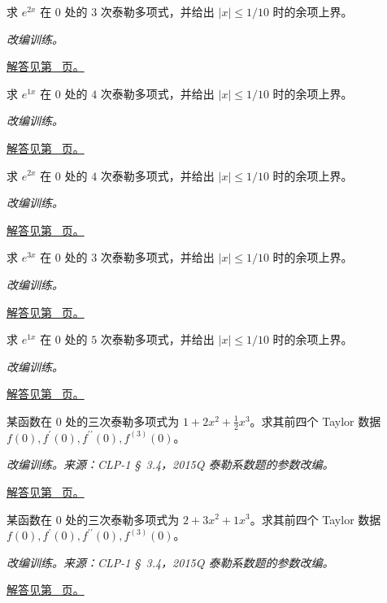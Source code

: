 \documentclass[UTF8,12pt,a4paper,fontset=fandol]{ctexart}
\begin{document}
\begin{example}[指数函数的泰勒多项式与余项]\label{ex:c10q15}
求 $e^{2x}$ 在 $0$ 处的 $3$ 次泰勒多项式，并给出 $|x|\le1/10$ 时的余项上界。
\par\textit{改编训练。}\par\hyperref[ans:c10q15]{解答见第~\pageref{ans:c10q15} 页。}
\end{example}
\begin{example}[指数函数的泰勒多项式与余项]\label{ex:c10q16}
求 $e^{1x}$ 在 $0$ 处的 $4$ 次泰勒多项式，并给出 $|x|\le1/10$ 时的余项上界。
\par\textit{改编训练。}\par\hyperref[ans:c10q16]{解答见第~\pageref{ans:c10q16} 页。}
\end{example}
\begin{example}[指数函数的泰勒多项式与余项]\label{ex:c10q17}
求 $e^{2x}$ 在 $0$ 处的 $4$ 次泰勒多项式，并给出 $|x|\le1/10$ 时的余项上界。
\par\textit{改编训练。}\par\hyperref[ans:c10q17]{解答见第~\pageref{ans:c10q17} 页。}
\end{example}
\begin{example}[指数函数的泰勒多项式与余项]\label{ex:c10q18}
求 $e^{3x}$ 在 $0$ 处的 $3$ 次泰勒多项式，并给出 $|x|\le1/10$ 时的余项上界。
\par\textit{改编训练。}\par\hyperref[ans:c10q18]{解答见第~\pageref{ans:c10q18} 页。}
\end{example}
\begin{example}[指数函数的泰勒多项式与余项]\label{ex:c10q19}
求 $e^{1x}$ 在 $0$ 处的 $5$ 次泰勒多项式，并给出 $|x|\le1/10$ 时的余项上界。
\par\textit{改编训练。}\par\hyperref[ans:c10q19]{解答见第~\pageref{ans:c10q19} 页。}
\end{example}
\begin{example}[由泰勒系数恢复导数]\label{ex:c10q20}
某函数在 $0$ 处的三次泰勒多项式为 $1+2x^2+\frac{1}{2}x^3$。求其前四个 Taylor 数据 $f(0),f^{\prime}(0),f^{\prime\prime}(0),f^{(3)}(0)$。
\par\textit{改编训练。来源：CLP-1 \S~3.4，2015Q 泰勒系数题的参数改编。}\par\hyperref[ans:c10q20]{解答见第~\pageref{ans:c10q20} 页。}
\end{example}
\begin{example}[由泰勒系数恢复导数]\label{ex:c10q21}
某函数在 $0$ 处的三次泰勒多项式为 $2+3x^2+1x^3$。求其前四个 Taylor 数据 $f(0),f^{\prime}(0),f^{\prime\prime}(0),f^{(3)}(0)$。
\par\textit{改编训练。来源：CLP-1 \S~3.4，2015Q 泰勒系数题的参数改编。}\par\hyperref[ans:c10q21]{解答见第~\pageref{ans:c10q21} 页。}
\end{example}
\end{document}
